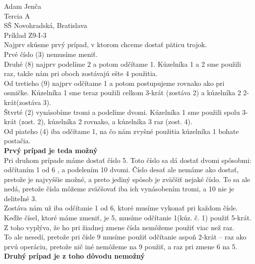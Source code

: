 \documentclass{article}
\begin{document}
\large
\noindent
Adam Jenča\\
Tercia A\\
SŠ Novohradská, Bratislava\\
Príklad Z9-I-3\\
\vskip 10mm \noindent
Najprv skúsme prvý prípad, v ktorom chceme dostať päticu trojok.\\
Prvé číslo (3) nemusíme meniť. \\
Druhé (8) najprv podelíme 2 a potom odčítame 1. Kúzelníka 1 a 2 sme použili raz, takže nám pri oboch zostávajú ešte 4 použitia. \\
Od tretieho (9) najprv odčítame 1 a potom postupujeme rovnako ako pri osmičke. Kúzelníka 1 sme teraz použili celkom 3-krát (zostáva 2) a kúzelníka 2 2-krát(zostáva 3).\\
Štvrté (2) vynásobíme tromi a podelíme dvomi. Kúzelníka 1 sme použili spolu 3-krát (zost. 2), kúzelníka 2 rovnako, a kúzelníka 3 raz (zost. 4).\\
Od piateho (4) iba odčítame 1, na čo nám zvyšné použitia kúzelníka 1 bohate postačia.\\
\textbf{Prvý prípad je teda možný}\\
Pri druhom prípade máme dostať číslo 5.
Toto číslo sa dá dostať dvomi spôsobmi: odčítaním 1 od 6 , a podelením 10 dvomi.
Číslo desať ale nemáme ako dostať, pretože je najvyššie možné, a preto jediný spôsob je zväčšiť nejaké číslo. To sa ale nedá, pretože čísla môžeme zväčšovať iba ich vynásobením tromi, a 10 nie je deliteľné 3.\\
Zostáva nám už iba odčítanie 1 od 6, ktoré musíme vykonať pri každom čísle.\\
Keďže čísel, ktoré máme zmeniť, je 5, musíme odčítanie 1(kúz. č. 1) použiť 5-krát.\\
Z toho vyplýva, že ho pri žiadnej zmene čísla nemôžeme použiť viac než raz.\\
To ale nesedí, pretože pri čísle 9 musíme použiť odčítanie aspoň 2-krát -- raz ako prvú operáciu, pretože nič iné nemôžeme na 9 použiť, a raz pri zmene 6 na 5.\\
\textbf{Druhý prípad je z toho dôvodu nemožný}
\end{document}
